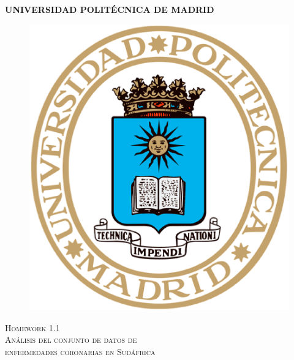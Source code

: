\begin{titlepage}
		\begin{center}
		\vspace{5 mm}\textbf{\Large UNIVERSIDAD POLITÉCNICA DE MADRID} \par
		\vspace{10 mm}
      			\begin{figure}[htb]
				\begin{center}
					\includegraphics[scale=0.3]{./images/logo-upm.eps}
				\end{center}
			\end{figure}\par
  


      \vspace{20 mm}\textsc{\Large Homework 1.1 \\ Análisis del conjunto de datos de \\ enfermedades coronarias en Sudáfrica } \par
      

\end{center}
\end{titlepage}
